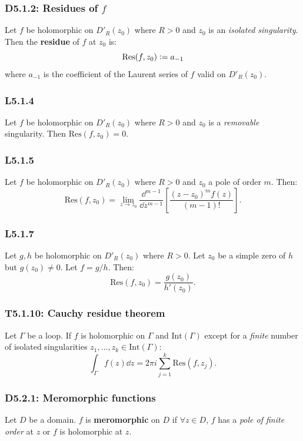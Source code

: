 \documentclass{article}
\newcommand{\deq}{\vcentcolon=}
\begin{document}
\begin{multicols*}{3}
\subsubsection*{D5.1.2: Residues of $f$}
Let $f$ be holomorphic on $D'_R(z_0)$ where $R>0$ and
$z_0$ is an \textit{isolated singularity}. Then the \textbf{residue}
of $f$ at $z_0$ is:
$$\text{Res}(f,z_0)\deq a_{-1}$$
where $a_{-1}$ is the coefficient of the Laurent series of $f$
valid on $D'_R(z_0)$.

\subsubsection*{L5.1.4}
Let $f$ be holomorphic on $D'_R(z_0)$ where $R>0$ and
$z_0$ is a \textit{removable} singularity. Then
$\text{Res}(f,z_0)=0$.

\subsubsection*{L5.1.5}
Let $f$ be holomorphic on $D'_R(z_0)$ where $R>0$ and $z_0$
a pole of order $m$. Then:
$$\text{Res}(f,z_0)=\lim_{z\rightarrow z_0}\frac{\dd^{m-1}}{\dd z^{m-1}}
\left[\frac{(z-z_0)^m f(z)}{(m-1)!}\right].$$

\subsubsection*{L5.1.7}
Let $g,h$ be holomorphic on $D'_R(z_0)$ where $R>0$.
Let $z_0$ be a simple zero of $h$ but $g(z_0)\neq0$.
Let $f=g/h$. Then:
$$\text{Res}(f,z_0)=\frac{g(z_0)}{h'(z_0)}.$$

\subsubsection*{T5.1.10: Cauchy residue theorem}
Let $\Gamma$ be a loop. If $f$ is holomorphic on
$\Gamma$ and $\text{Int}(\Gamma)$ except for a \textit{finite} number of
isolated singularities $z_1,\dots,z_k\in\text{Int}(\Gamma)$:
$$\int_{\Gamma}f(z)\dd z=2\pi i\sum_{j=1}^{k}\text{Res}(f,z_j).$$

\newcolumn

\subsubsection*{D5.2.1: Meromorphic functions}
Let $D$ be a domain. $f$ is \textbf{meromorphic} on $D$ if $\forall z\in D$,
$f$ has a \textit{pole of finite order} at $z$ or $f$ is holomorphic at $z$.


\end{multicols*}
\end{document}

